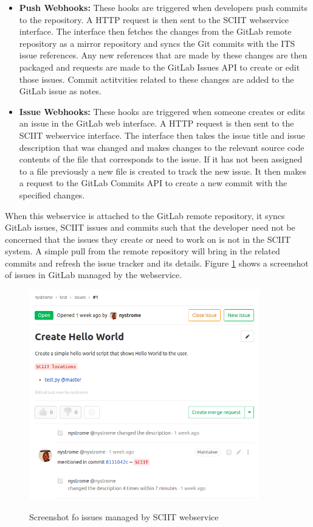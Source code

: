 \documentclass{mproj}
\begin{document}
\begin{itemize}
  \item \textbf{Push Webhooks:} These hooks are triggered when developers push commits to the repository. A HTTP request is then sent to the SCIIT webservice interface. The interface then fetches the changes from the GitLab remote repository as a mirror repository and syncs the Git commits with the ITS issue references. Any new references that are made by these changes are then packaged and requests are made to the GitLab Issues API to create or edit those issues. Commit actitvities related to these changes are added to the GitLab issue as notes.
  \item \textbf{Issue Webhooks:} These hooks are triggered when someone creates or edits an issue in the GitLab web interface. A HTTP request is then sent to the SCIIT webservice interface. The interface then takes the issue title and issue description that was changed and makes changes to the relevant source code contents of the file that corresponds to the issue. If it has not been assigned to a file previously a new file is created to track the new issue. It then makes a request to the GitLab Commits API to create a new commit with the specified changes.
\end{itemize}

When this webservice is attached to the GitLab remote repository, it syncs GitLab issues, SCIIT issues and commits such that the developer need not be concerned that the issues they create or need to work on is not in the SCIIT system. A simple pull from the remote repository will bring in the related commits and refresh the issue tracker and its details. Figure \ref{fig:sciit-gitlab-shot} shows a screenshot of issues in GitLab managed by the webservice.


\begin{figure}[t]
\centering
  \caption{Screenshot fo issues managed by SCIIT webservice}
  \includegraphics[width=10cm]{sciit-gitlab-shot}
  \label{fig:sciit-gitlab-shot}
\end{figure}
\end{document}
